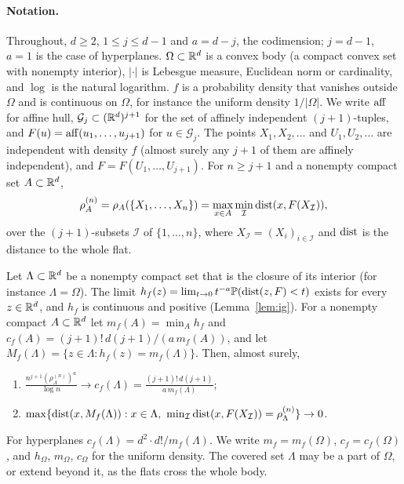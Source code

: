 \documentclass[11pt]{article}
\begin{document}
\paragraph{Notation.} Throughout, $d\ge2$, $1\le j\le d-1$ and $a=d-j$, the codimension; $j=d-1$, $a=1$ is the case of
hyperplanes. $\Omega\subset\mathbb{R}^d$ is a convex body (a compact convex set with nonempty interior), $|\cdot|$ is Lebesgue measure,
Euclidean norm or cardinality, and $\log$ is the natural logarithm. $f$ is a probability density that vanishes outside $\Omega$ and
is continuous on $\Omega$, for instance the uniform density $1/|\Omega|$. We write $\operatorname{aff}$ for affine hull, $\mathcal G_j\subset(\mathbb{R}^d)^{j+1}$
for the set of affinely independent $(j+1)$-tuples, and $F(u)=\operatorname{aff}(u_1,\dots,u_{j+1})$ for $u\in\mathcal G_j$. The points $X_1,X_2,\dots$
and $U_1,U_2,\dots$ are independent with density $f$ (almost surely any $j+1$ of them are affinely independent), and
$F=F(U_1,\dots,U_{j+1})$. For $n\ge j+1$ and a nonempty compact set $A\subset\mathbb{R}^d$,
\[
  \rho_A^{(n)}=\rho_A(\{X_1,\dots,X_n\})=\max_{x\in A}\min_{\mathcal I}\operatorname{dist}(x,F(X_{\mathcal I})),
\]
over the $(j+1)$-subsets $\mathcal I$ of $\{1,\dots,n\}$, where $X_{\mathcal I}=(X_i)_{i\in\mathcal I}$ and $\operatorname{dist}$ is the distance to the
whole flat.

\begin{theorem}\label{thm:main}
Let $\Lambda\subset\mathbb{R}^d$ be a nonempty compact set that is the closure of its interior (for instance $\Lambda=\Omega$). The limit
$h_f(z)=\lim_{t\to0}t^{-a}\mathbb{P}(\operatorname{dist}(z,F)<t)$ exists for every $z\in\mathbb{R}^d$, and $h_f$ is continuous and positive
(Lemma~\ref{lem:ig}). For a nonempty compact $A\subset\mathbb{R}^d$ let $m_f(A)=\min_Ah_f$ and $c_f(A)=(j+1)!\,d(j+1)/(a\,m_f(A))$, and let
$M_f(\Lambda)=\{z\in\Lambda:h_f(z)=m_f(\Lambda)\}$. Then, almost surely,
\begin{enumerate}
\item[(a)] $\displaystyle\frac{n^{j+1}(\rho_\Lambda^{(n)})^a}{\log n}\to c_f(\Lambda)=\frac{(j+1)!\,d(j+1)}{a\,m_f(\Lambda)}$;
\item[(b)] $\max\{\dist(x,M_f(\Lambda)):x\in\Lambda,\ \min_{\mathcal I}\dist(x,F(X_{\mathcal I}))=\rho_\Lambda^{(n)}\}\to0$.
\end{enumerate}
\end{theorem}

For hyperplanes $c_f(\Lambda)=d^2\cdot d!/m_f(\Lambda)$. We write $m_f=m_f(\Omega)$, $c_f=c_f(\Omega)$, and $h_\Omega$, $m_\Omega$, $c_\Omega$ for the
uniform density. The covered set $\Lambda$ may be a part of $\Omega$, or extend beyond it, as the flats cross the whole body.
\end{document}
